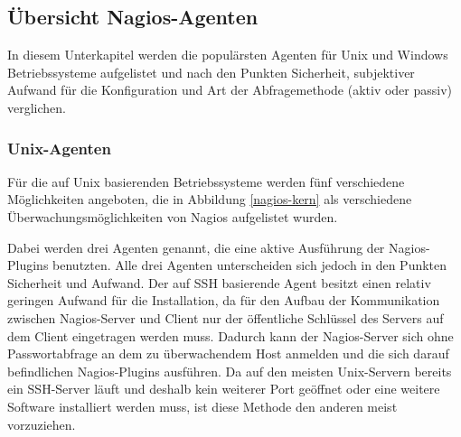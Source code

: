 \subsection{Übersicht Nagios-Agenten}
In diesem Unterkapitel werden die populärsten Agenten für Unix und Windows Betriebssysteme aufgelistet und nach den Punkten Sicherheit, subjektiver Aufwand für die Konfiguration und Art der Abfragemethode (aktiv oder passiv) verglichen.

\subsubsection{Unix-Agenten}
Für die auf Unix basierenden Betriebssysteme werden fünf verschiedene Möglichkeiten angeboten, die in Abbildung \ref{nagios-kern} als verschiedene Überwachungsmöglichkeiten von Nagios aufgelistet wurden.



Dabei werden drei Agenten genannt, die eine aktive Ausführung der Nagios-Plugins benutzten.
Alle drei Agenten unterscheiden sich jedoch in den Punkten Sicherheit und Aufwand.
Der auf \gls{SSH} basierende Agent besitzt einen relativ geringen Aufwand für die Installation, da für den Aufbau der Kommunikation zwischen Nagios-Server und Client nur der öffentliche Schlüssel des Servers auf dem Client eingetragen werden muss.
Dadurch kann der Nagios-Server sich ohne Passwortabfrage an dem zu überwachendem Host anmelden und die sich darauf befindlichen Nagios-Plugins ausführen.
Da auf den meisten Unix-Servern bereits ein \gls{SSH}-Server läuft und deshalb kein weiterer Port geöffnet oder eine weitere Software installiert werden muss, ist diese Methode den anderen meist vorzuziehen.

